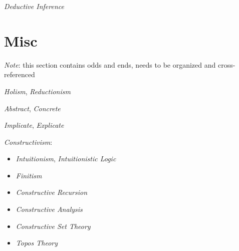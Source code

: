 \emph{Deductive Inference}



\section{Misc}

\emph{Note}: this section contains odds and ends, needs to be
organized and cross-referenced

\emph{Holism}, \emph{Reductionism}

\emph{Abstract}, \emph{Concrete}

\emph{Implicate}, \emph{Explicate}

\emph{Constructivism}:
\begin{itemize}
    \item \emph{Intuitionism}, \emph{Intuitionistic Logic}
    \item \emph{Finitism}
    \item \emph{Constructive Recursion}
    \item \emph{Constructive Analysis}
    \item \emph{Constructive Set Theory}
    \item \emph{Topos Theory}
\end{itemize}
